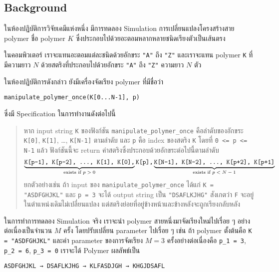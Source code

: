 
\subsection*{\sectionfont\upshape Background}

ในห้องปฏิบัติการวิจัยเคมีแห่งหนึ่ง มีการทดลอง Simulation การเปลี่ยนแปลงโครงสร้างสาย polymer 
ชื่อ polymer $K$ ซึ่งประกอบไปด้วยอะตอมหลากหลายชนิดเรียงตัวเป็นเส้นตรง

ในคอมพิวเตอร์ เราจะแทนอะตอมแต่ละชนิดด้วยอักขระ \verb|"A"| ถึง \verb|"Z"| 
และเราจะแทน polymer \lstinline{K} ที่มีความยาว $N$ ด้วยสตริงที่ประกอบไปด้วยอักขระ 
\verb|"A"| ถึง \verb|"Z"| ความยาว $N$ ตัว

ในห้องปฏิบัติการดังกล่าว ยังมีเครื่องจัดเรียง polymer ที่มีชื่อว่า
\begin{center}
    \lstinline{manipulate_polymer_once(K[0...N-1], p)} 
\end{center} 
ซึ่งมี Specification ในการทำงานดังต่อไปนี้

\begin{fullwidth}
    \vspace{2\baselineskip}
    \begin{quote}
        หาก input string \lstinline{K} ของฟังก์ชัน \lstinline{manipulate_polymer_once}
        คือลำดับของอักขระ \verb|K[0]|, \verb|K[1]|, \ldots, \verb|K[N-1]| ตามลำดับ 
        และ \lstinline{p} คือ index ของสตริง \lstinline{K} โดยที่ \lstinline{0 <= p <= N-1} 
        แล้ว ฟังก์ชันนี้จะ return ค่าสตริงซึ่งประกอบด้วยอักขระต่อไปนี้ตามลำดับ
        \[
            \underbrace{\text{\ttfamily K[p-1], K[p-2], \ldots, K[1], K[0],}}_\text{exists if $p > 0$}
            \text{\ttfamily K[p],} 
            \underbrace{\text{\ttfamily K[N-1], K[N-2], \ldots, K[p+2], K[p+1]}}_\text{exists if $p < N-1$}
        \]    
        ยกตัวอย่างเช่น ถ้า input ของ \lstinline{manipulate_polymer_once} ได้แก่ 
        \lstinline{K = "ASDFGHJKL"} และ \lstinline{p = 3}\;
        จะได้ output string เป็น \lstinline{"DSAFLKJHG"}\;
        สังเกตว่า \verb|F| จะอยู่ในตำแหน่งเดิมไม่เปลี่ยนแปลง แต่สตริงย่อยที่อยู่ข้างหน้าและข้างหลังจะถูกเรียงกลับหลัง
    \end{quote}
    \vspace{2\baselineskip}
\end{fullwidth}

ในการทำการทดลอง Simulation จริง เราจะนำ polymer สายหนึ่งมาจัดเรียงใหม่ไปเรื่อย ๆ 
อย่างต่อเนื่องเป็นจำนวน $M$ ครั้ง โดยปรับเปลี่ยน parameter ไปเรื่อย ๆ เช่น ถ้า polymer ตั้งต้นคือ 
\lstinline{K = "ASDFGHJKL"} และค่า parameter ของการจัดเรียง $M = 3$ ครั้งอย่างต่อเนื่องคือ 
\lstinline{p_1 = 3}, \lstinline{p_2 = 6}, \lstinline{p_3 = 0} เราจะได้ Polymer ผลลัพธ์เป็น
\begin{center}
    \texttt{ASDFGHJKL → DSAFLKJHG → KLFASDJGH → KHGJDSAFL}
\end{center}


